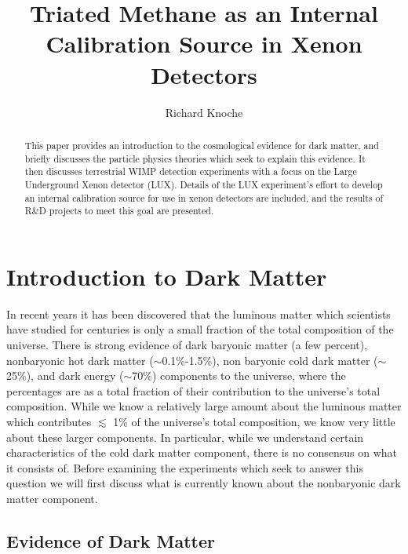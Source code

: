\documentclass[a4paper,12pt]{article}
\begin{document}
\title{Triated Methane as an Internal Calibration Source in Xenon Detectors}
\author{Richard Knoche}
\maketitle

\begin{abstract}
This paper provides an introduction to the cosmological evidence for dark matter, and briefly discusses the particle physics theories which seek to explain this evidence.  It then discusses terrestrial WIMP detection experiments with a focus on the Large Underground Xenon detector (LUX).  Details of the LUX experiment's effort to develop an internal calibration source for use in xenon detectors are included, and the results of R\&D projects to meet this goal are presented.
\end{abstract}

\tableofcontents



\section{Introduction to Dark Matter}

In recent years it has been discovered that the luminous matter which scientists have studied for centuries is only a small fraction of the total composition of the universe.  There is strong evidence of dark baryonic matter (a few percent), nonbaryonic hot dark matter ($\sim$0.1\%-1.5\%), non baryonic cold dark matter ($\sim$25\%), and dark energy ($\sim$70\%) components to the universe, where the percentages are as a total fraction of their contribution to the universe's total composition.  While we know a relatively large amount about the luminous matter which contributes $ \lesssim $ 1\% of the universe's total composition, we know very little about these larger components.  In particular, while we understand certain characteristics of the cold dark matter component, there is no consensus on what it consists of.  Before examining the experiments which seek to answer this question we will first discuss what is currently known about the nonbaryonic dark matter component.

\subsection{Evidence of Dark Matter}
\end{document}
